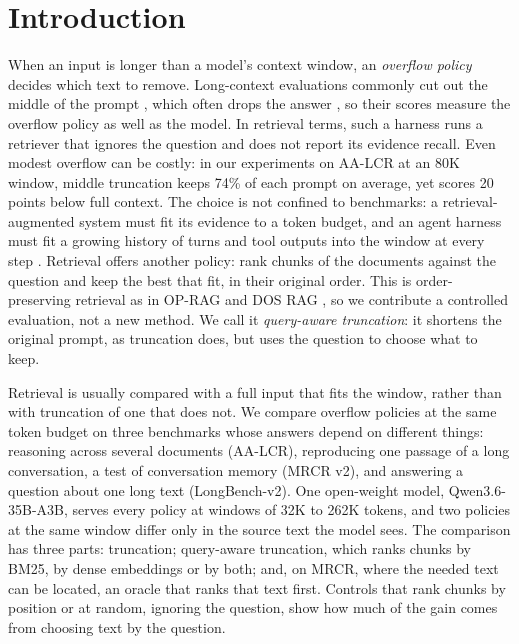 \documentclass[letterpaper]{article} %
\begin{document}
\section{Introduction}
When an input is longer than a model's context window, an \emph{overflow policy} decides which text to remove. Long-context evaluations commonly cut out the middle of the prompt \cite{bai2024longbench,bai2025longbenchv2,zhang2024infinitebench,huang2026atlas}, which often drops the answer \cite{arjmandi2026distractor}, so their scores measure the overflow policy as well as the model. In retrieval terms, such a harness runs a retriever that ignores the question and does not report its evidence recall. Even modest overflow can be costly: in our experiments on AA-LCR at an 80K window, middle truncation keeps 74\% of each prompt on average, yet scores 20 points below full context. The choice is not confined to benchmarks: a retrieval-augmented system must fit its evidence to a token budget, and an agent harness must fit a growing history of turns and tool outputs into the window at every step \cite{packer2023memgpt}. Retrieval offers another policy: rank chunks of the documents against the question and keep the best that fit, in their original order. This is order-preserving retrieval as in OP-RAG and DOS RAG \cite{yu2024oprag,laitenberger2025dosrag}, so we contribute a controlled evaluation, not a new method. We call it \emph{query-aware truncation}: it shortens the original prompt, as truncation does, but uses the question to choose what to keep.

Retrieval is usually compared with a full input that fits the window, rather than with truncation of one that does not. We compare overflow policies at the same token budget on three benchmarks whose answers depend on different things: reasoning across several documents (AA-LCR), reproducing one passage of a long conversation, a test of conversation memory (MRCR v2), and answering a question about one long text (LongBench-v2). One open-weight model, Qwen3.6-35B-A3B, serves every policy at windows of 32K to 262K tokens, and two policies at the same window differ only in the source text the model sees. The comparison has three parts: truncation; query-aware truncation, which ranks chunks by BM25, by dense embeddings or by both; and, on MRCR, where the needed text can be located, an oracle that ranks that text first. Controls that rank chunks by position or at random, ignoring the question, show how much of the gain comes from choosing text by the question.
\end{document}
